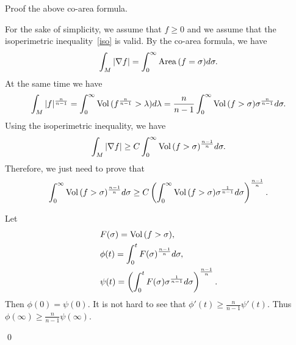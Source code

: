 \begin{ex} Proof the above co-area formula.
\end{ex}

For the sake of simplicity, we assume that $f\geq 0$ and we assume that the isoperimetric inequality~\eqref{iso} is valid. By the co-area formula, we have
\[
\int_M|\nabla f|=\int_0^\infty{\rm Area}\,(f=\sigma)d\sigma.
\]
At the same time we have
\[
\int_M|f|^{\frac{n}{n-1}}=\int_0^\infty{\rm Vol}\,(f^{\frac{n}{n-1}}>\lambda)d\lambda
=\frac{n}{n-1}\int_0^\infty{\rm Vol}\,(f>\sigma)\sigma^{\frac{n}{n-1}}d\sigma.
\]
Using the isoperimetric inequality, we have
\[
\int_M|\nabla f|\geq C\int_0^\infty{\rm Vol}\,(f>\sigma)^{\frac{n-1}{n}}d\sigma.
\]
Therefore, we just need to prove that 
\[
\int_0^\infty{\rm Vol}\,(f>\sigma)^{\frac{n-1}{n}}d\sigma\geq C\left(\int_0^\infty{\rm Vol}\,(f>\sigma)\sigma^{\frac{1}{n-1}}d\sigma\right)^{\frac{n-1}{n}}.
\]

Let 
\begin{align*}
& F(\sigma)={\rm Vol}\,(f>\sigma),\\
&\phi(t)=\int^t_0F(\sigma)^{\frac{n-1}{n}}d\sigma,\\
&\psi(t)=\left(\int_0^t F(\sigma)\sigma^{\frac{1}{n-1}}d\sigma\right)^{\frac{n-1}{n}}.
\end{align*}
Then $\phi(0)=\psi(0)$. It is not hard to see that $\phi'(t)\geq \frac{n}{n-1}\psi'(t)$. Thus $\phi(\infty)\geq\frac{n}{n-1}\psi(\infty)$.

\qed